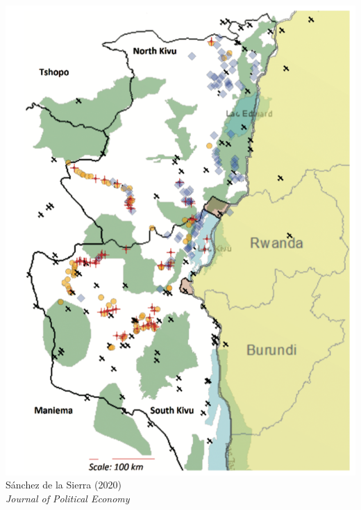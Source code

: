 \documentclass[aspectratio=43]{beamer}
\begin{document}
\begin{frame}
\begin{minipage}{0.34\textwidth}
  \includegraphics[width = \textwidth]{img/sanchez_de_la_sierra_sample}\\
  {\footnotesize Sánchez de la Sierra (2020)\\\textit{Journal of Political Economy}\\}
\end{minipage}

\end{frame}
\end{document}
